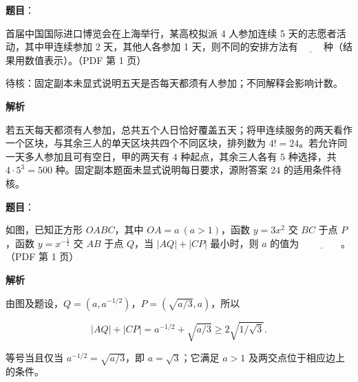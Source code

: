 \begin{answer}

\textbf{题目}：

首届中国国际进口博览会在上海举行，某高校拟派 4 人参加连续 5 天的志愿者活动，其中甲连续参加 2 天，其他人各参加 1 天，则不同的安排方法有 $\underline{\qquad}$ 种（结果用数值表示）。（PDF 第 1 页）

\begin{gktip}
待核：固定副本未显式说明五天是否每天都须有人参加；不同解释会影响计数。
\end{gktip}

\textbf{解析}

若五天每天都须有人参加，总共五个人日恰好覆盖五天；将甲连续服务的两天看作一个区块，与其余三人的单天区块共四个不同区块，排列数为 $4!=24$。若允许同一天多人参加且可有空日，甲的两天有 $4$ 种起点，其余三人各有 $5$ 种选择，共 $4\cdot5^3=500$ 种。固定副本题面未显式说明每日要求，源附答案 $24$ 的适用条件待核。


\end{answer}
\begin{answer}

\textbf{题目}：

如图，已知正方形 $OABC$，其中 $OA=a\ (a>1)$，函数 $y=3x^2$ 交 $BC$ 于点 $P$，函数 $y=x^{-\frac12}$ 交 $AB$ 于点 $Q$，当 $|AQ|+|CP|$ 最小时，则 $a$ 的值为 $\underline{\qquad\qquad}$。（PDF 第 1 页）
\nopagebreak[4]
\begin{center}\end{center}
\nopagebreak[4]
\textbf{解析}

由图及题设，$Q=(a,a^{-1/2})$，$P=(\sqrt{a/3},a)$，所以

\nopagebreak[4]
\[
|AQ|+|CP|=a^{-1/2}+\sqrt{a/3}\geqslant 2\sqrt{1/\sqrt3}.
\]

等号当且仅当 $a^{-1/2}=\sqrt{a/3}$，即 $a=\sqrt3$；它满足 $a>1$ 及两交点位于相应边上的条件。


\end{answer}
